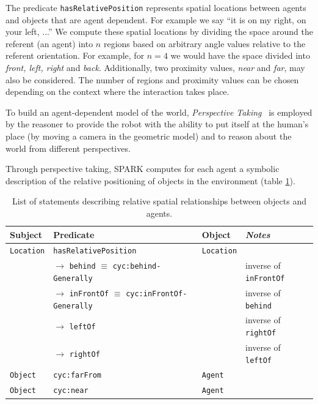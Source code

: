 \documentclass{svmult}
\newcommand{\concept}[1]{{\footnotesize \texttt{#1}}}
\begin{document}
The predicate \concept{hasRelativePosition} represents spatial locations
between agents and objects that are agent dependent.  For example we say ``it
is on my right, on your left, ...'' We compute these spatial locations by
dividing the space around the referent (an agent) into $n$ regions based on
arbitrary angle values relative to the referent orientation.  For example, for
$n = 4$ we would have the space divided into \emph{front, left, right} and
\emph{back}. Additionally, two proximity values, \emph{near} and \emph{far},
may also be considered. The number of regions and proximity values can be
chosen depending on the context where the interaction takes place.


To build an agent-dependent model of the world, \emph{Perspective
Taking}~\cite{Flavell1992,Tversky1999} is employed by the reasoner to provide
the robot with the ability to put itself at the human's place (by moving a
camera in the geometric model) and to reason about the world from different
perspectives.


Through perspective taking, SPARK computes for each agent a symbolic
description of the relative positioning of objects in the environment (table
\ref{facts|relative}).

\begin{table}[h]
	\centering
	    \begin{tabular}{p{1.5cm}p{6cm}p{1.5cm}l}
		\rowcolor{white}
		\textbf{Subject} & \textbf{Predicate} & \textbf{Object} & \emph{Notes} \\
		\hline
	 \concept{Location}  & \concept{hasRelativePosition}  & \concept{Location} & \\ 
	 & 	$\rightarrow$ \concept{behind} $\equiv$ \concept{cyc:behind-Generally}  &  & inverse of \concept{inFrontOf}  \\ 
	 &  $\rightarrow$ \concept{inFrontOf} $\equiv$ \concept{cyc:inFrontOf-Generally}  & 	 & 	 inverse of \concept{behind}  \\ 
	 &  $\rightarrow$ \concept{leftOf}  &  &  inverse of \concept{rightOf} \\ 
	 &  $\rightarrow$ \concept{rightOf}  & 	 & 	 inverse of \concept{leftOf}  \\ 
	 \concept{Object}  & \concept{cyc:farFrom}  &  \concept{Agent} & \\ 
	 \concept{Object}  & \concept{cyc:near}  &  \concept{Agent} & 
	\end{tabular}
	\caption{List of statements describing relative spatial relationships between objects and agents.}
	\label{facts|relative}
\end{table}
\end{document}
